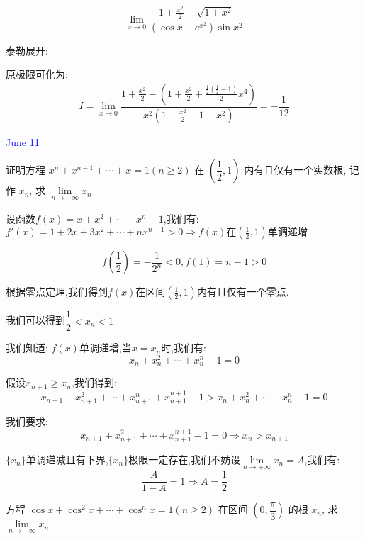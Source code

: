 \begin{example}[][Exam: 32.2.6]
	$$\lim\limits_{x\to 0}\dfrac{1+\frac{x^2}{2}-\sqrt{1+x^2}}{(\cos x-e^{x^2})\sin x^2}$$
\end{example}

\begin{solution}
	
	泰勒展开: 
	
	原极限可化为: 
	\begin{eqnarray*}
		I=\lim\limits_{x\to 0}\dfrac{1+\frac{x^2}{2}-(1+\frac{x^2}{2}+\frac{\frac{1}{2}(\frac{1}{2}-1)}{2}x^4)}{x^2(1-\frac{x^2}{2}-1-x^2)}=-\dfrac{1}{12}
	\end{eqnarray*}
\end{solution}


\textcolor{blue}{June 11}

\begin{example}[][Exam: 32.2.7]
	证明方程 $x^n+x^{n-1}+\cdots+x=1(n\geq 2)$ 在 $(\dfrac{1}{2},1)$ 内有且仅有一个实数根,
	记作 $x_{n}$, 求 $\lim\limits_{n\to+\infty}x_{n}$
\end{example}

\begin{solution}
	
	设函数$f(x)=x+x^2+\cdots+x^n-1$,我们有: $f'(x)=1+2x+3x^2+\cdots+nx^{n-1}>0\Rightarrow f(x)\text{在}(\frac{1}{2},1)\text{单调递增}$
	
	$$f(\frac{1}{2})=-\frac{1}{2^n}<0, f(1)=n-1>0$$
	
	根据零点定理,我们得到$f(x)$在区间$(\frac{1}{2},1)$内有且仅有一个零点.
	
	我们可以得到$\dfrac{1}{2}<x_{n}<1$
	
	我们知道: $f(x)$单调递增,当$x=x_{n}$时,我们有: 
	$$x_{n}+x_{n}^2+\cdots+x_{n}^n-1=0$$
	
	假设$x_{n+1}\geq x_{n}$,我们得到: 
	$$x_{n+1}+x_{n+1}^2+\cdots+x_{n+1}^n+x_{n+1}^{n+1}-1>x_{n}+x_{n}^2+\cdots+x_{n}^n-1=0$$
	
	我们要求: 
	$$x_{n+1}+x_{n+1}^2+\cdots+x_{n+1}^{n+1}-1=0\Rightarrow x_{n}>x_{n+1}$$
	
	$\{x_{n}\}$单调递减且有下界,$\{x_{n}\}$极限一定存在,我们不妨设$\lim\limits_{n\to +\infty}x_{n}=A$,我们有: 
	$$\dfrac{A}{1-A}=1\Rightarrow A=\dfrac{1}{2}$$
	
\end{solution}

\begin{example}[][Exam: 32.2.8]
	方程 $\cos x+\cos^2 x+\cdots+\cos^n x=1(n\geq 2)$ 在区间 $(0,\dfrac{\pi}{3})$ 的根 $x_{n}$,
	求 $\lim\limits_{n\to+\infty}x_{n}$
\end{example}

